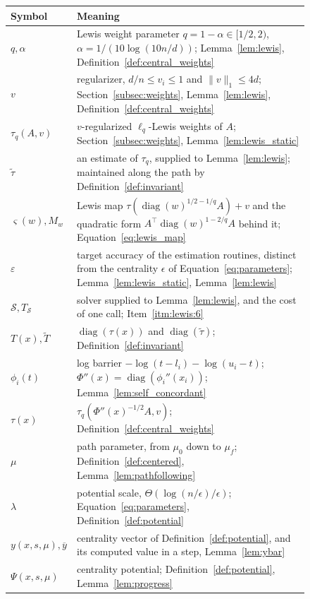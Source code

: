 \documentclass[11pt]{article}
\newcommand{\diag}{\operatorname{diag}}
\newcommand{\tautil}{\widetilde{\tau}}
\begin{document}
\begin{figure}[H]
\begin{center}\small
\begin{tabular}{@{}lp{}@{}}
\toprule
Symbol & Meaning \\
\midrule
$q,\alpha$ & Lewis weight parameter $q=1-\alpha\in[1/2,2)$, $\alpha=1/(10\log(10n/d))$; Lemma~\ref{lem:lewis}, Definition~\ref{def:central_weights} \\
$v$ & regularizer, $d/n\le v_i\le1$ and $\|v\|_1\le4d$; Section~\ref{subsec:weights}, Lemma~\ref{lem:lewis}, Definition~\ref{def:central_weights} \\
$\tau_q(A,v)$ & $v$-regularized $\ell_q$-Lewis weights of $A$; Section~\ref{subsec:weights}, Lemma~\ref{lem:lewis_static} \\
$\tautil$ & an estimate of $\tau_q$, supplied to Lemma~\ref{lem:lewis}; maintained along the path by Definition~\ref{def:invariant} \\
$\varsigma(w),M_w$ & Lewis map $\tau(\diag(w)^{1/2-1/q}A)+v$ and the quadratic form $A^\top\diag(w)^{1-2/q}A$ behind it; Equation~\eqref{eq:lewis_map} \\
$\varepsilon$ & target accuracy of the estimation routines, distinct from the centrality $\epsilon$ of Equation~\eqref{eq:parameters}; Lemma~\ref{lem:lewis_static}, Lemma~\ref{lem:lewis} \\
$\mathcal S,T_{\mathcal S}$ & solver supplied to Lemma~\ref{lem:lewis}, and the cost of one call; Item~\ref{itm:lewis:6} \\
$T(x),\widetilde T$ & $\diag(\tau(x))$ and $\diag(\tautil)$; Definition~\ref{def:invariant} \\
$\phi_i(t)$ & log barrier $-\log(t - l_i) - \log(u_i - t)$; $\Phi''(x) = \diag(\phi_i''(x_i))$; Lemma~\ref{lem:self_concordant} \\
$\tau(x)$ & $\tau_q(\Phi''(x)^{-1/2} A, v)$; Definition~\ref{def:central_weights} \\
$\mu$ & path parameter, from $\mu_0$ down to $\mu_f$; Definition~\ref{def:centered}, Lemma~\ref{lem:pathfollowing} \\
$\lambda$ & potential scale, $\Theta(\log(n / \epsilon) / \epsilon)$; Equation~\eqref{eq:parameters}, Definition~\ref{def:potential} \\
$y(x,s,\mu),\overline y$ & centrality vector of Definition~\ref{def:potential}, and its computed value in a step, Lemma~\ref{lem:ybar} \\
$\Psi(x,s,\mu)$ & centrality potential; Definition~\ref{def:potential}, Lemma~\ref{lem:progress} \\

\end{tabular}
\end{center}
\end{figure}
\end{document}
